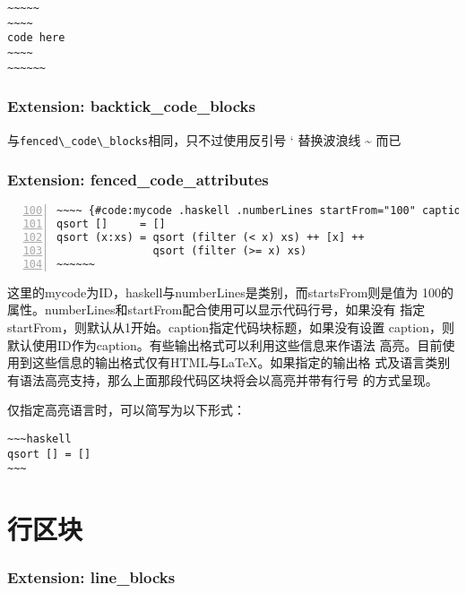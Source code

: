 \documentclass[cn]{elegantbook}
\newcommand{\passthrough}[1]{#1}
\begin{document}
\begin{lstlisting}
~~~~~
~~~~
code here
~~~~
~~~~~~
\end{lstlisting}

\hypertarget{extension-backtick_code_blocks}{%
\subsubsection{Extension:
backtick\_code\_blocks}\label{extension-backtick_code_blocks}}

与\passthrough{\lstinline!fenced\_code\_blocks!}相同，只不过使用反引号 `
替换波浪线 \textasciitilde{} 而已

\hypertarget{extension-fenced_code_attributes}{%
\subsubsection{Extension:
fenced\_code\_attributes}\label{extension-fenced_code_attributes}}

\begin{lstlisting}[numbers=left, firstnumber=100, caption=围栏式代码块, label=code:fencedcode, float=htbp]
~~~~ {#code:mycode .haskell .numberLines startFrom="100" caption="围栏式代码块"}
qsort []     = []
qsort (x:xs) = qsort (filter (< x) xs) ++ [x] ++
               qsort (filter (>= x) xs)
~~~~~~
\end{lstlisting}

这里的mycode为ID，haskell与numberLines是类别，而startsFrom则是值为
100的属性。numberLines和startFrom配合使用可以显示代码行号，如果没有
指定startFrom，则默认从1开始。caption指定代码块标题，如果没有设置
caption，则默认使用ID作为caption。有些输出格式可以利用这些信息来作语法
高亮。目前使用到这些信息的输出格式仅有HTML与LaTeX。如果指定的输出格
式及语言类别有语法高亮支持，那么上面那段代码区块将会以高亮并带有行号
的方式呈现。

仅指定高亮语言时，可以简写为以下形式：

\begin{lstlisting}
~~~haskell
qsort [] = []
~~~
\end{lstlisting}

\hypertarget{ux884cux533aux5757}{%
\section{行区块}\label{ux884cux533aux5757}}

\hypertarget{extension-line_blocks}{%
\subsubsection{Extension: line\_blocks}\label{extension-line_blocks}}
\end{document}
